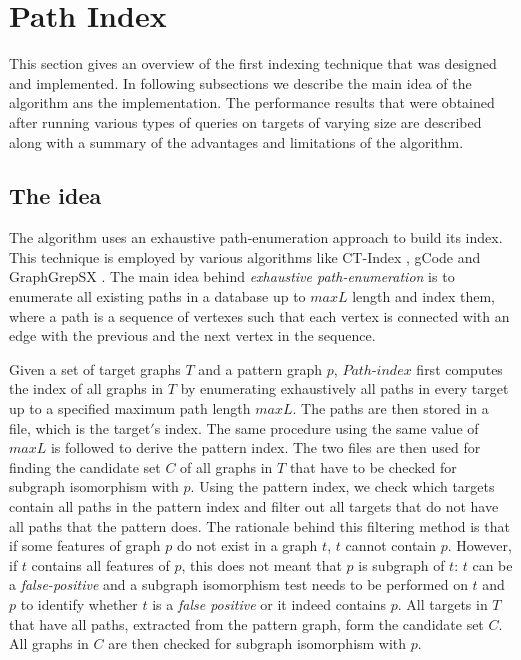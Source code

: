 \documentclass{l4proj}
\begin{document}
\section{Path Index}
\label{path-index}
This section gives an overview of the first indexing technique that was designed and implemented. In following subsections we describe the main idea of the algorithm ans the implementation. The performance results that were obtained after running various types of queries on targets of varying size are described along with a summary of the advantages and limitations of the algorithm.\par
\subsection{The idea}
\label{path-index-idea}
    The algorithm uses an exhaustive path-enumeration approach to build its index. This technique is employed by various algorithms like CT-Index \cite{ctindex}, gCode \cite{gcode} and GraphGrepSX \cite{graphgrepsx}. The main idea behind \textit{exhaustive path-enumeration} is to enumerate all existing paths in a database up to $maxL$ length and index them, where a path is a sequence of vertexes such that each vertex is connected with an edge with the previous and the next vertex in the sequence.\par
   Given a set of target graphs $T$ and a pattern graph $p$, $Path$-$index$ first computes the index of all graphs in $T$ by enumerating exhaustively all paths in every target up to a specified maximum path length $maxL$. The paths are then stored in a file, which is the target$'$s index. The same procedure using the same value of $maxL$ is followed to derive the pattern index. The two files are then used for finding the candidate set $C$ of all graphs in $T$ that have to be checked for subgraph isomorphism with $p$. Using the pattern index, we check which targets contain all paths in the pattern index and filter out all targets that do not have all paths that the pattern does. The rationale behind this filtering method is that if some features of graph $p$ do not exist in a graph $t$, $t$ cannot contain $p$. However, if $t$ contains all features of $p$, this does not meant that $p$ is subgraph of $t$: $t$ can be a \textit{false-positive} and a subgraph isomorphism test needs to be performed on $t$ and $p$ to identify whether $t$ is a \textit{false positive} or it indeed contains $p$. All targets in $T$ that have all paths, extracted from the pattern graph, form the candidate set $C$. All graphs in $C$ are then checked for subgraph isomorphism with $p$. \par
\end{document}
